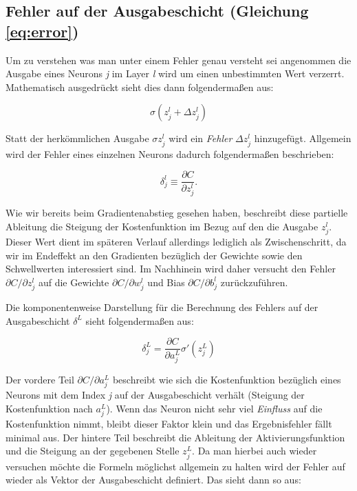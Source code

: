 \subsection{Fehler auf der Ausgabeschicht (Gleichung \ref{eq:error})}
Um zu verstehen was man unter einem Fehler genau versteht sei angenommen die Ausgabe eines Neurons \emph{j} im Layer \emph{l} wird um einen unbestimmten Wert verzerrt. Mathematisch ausgedrückt sieht dies dann folgendermaßen aus: 

\begin{equation}
\sigma(z^l_j+\Delta z^l_j)
\end{equation}

Statt der herkömmlichen Ausgabe $\sigma{z^l_j}$ wird ein \emph{Fehler} $\Delta z^l_j$ hinzugefügt. Allgemein wird der Fehler eines einzelnen Neurons dadurch folgendermaßen beschrieben: 

\begin{equation}
\delta^l_j \equiv \frac{\partial C}{\partial z^l_j}.
\end{equation}

Wie wir bereits beim Gradientenabstieg gesehen haben, beschreibt diese partielle Ableitung die \glqq Steigung \grqq der Kostenfunktion im Bezug auf den die Ausgabe $z^l_j$. Dieser Wert dient im späteren Verlauf allerdings lediglich als Zwischenschritt, da wir im Endeffekt an den Gradienten bezüglich der Gewichte sowie den Schwellwerten interessiert sind. Im Nachhinein wird daher versucht den Fehler ${\partial C / \partial z^l_j}$ auf die Gewichte ${\partial C / \partial w^l_j}$ und Bias ${\partial C / \partial b^l_j}$ zurückzuführen. 

Die komponentenweise Darstellung für die Berechnung des Fehlers auf der Ausgabeschicht $\delta^L$ sieht folgendermaßen aus:

\begin{equation}
\delta^L_j = \frac{\partial C}{\partial a^L_j} \sigma'(z^L_j)
\end{equation}

Der vordere Teil $\partial C / \partial a^L_j$ beschreibt wie sich die Kostenfunktion bezüglich eines Neurons mit dem Index \emph{j} auf der Ausgabeschicht verhält (Steigung der Kostenfunktion nach $a^L_j$). Wenn das Neuron nicht sehr viel \emph{Einfluss} auf die Kostenfunktion nimmt, bleibt dieser Faktor klein und das Ergebnisfehler fällt minimal aus. Der hintere Teil beschreibt die Ableitung der Aktivierungsfunktion und die Steigung an der gegebenen Stelle $z^L_j$. 
Da man hierbei auch wieder versuchen möchte die Formeln möglichst allgemein zu halten wird der Fehler auf wieder als Vektor der Ausgabeschicht definiert. Das sieht dann so aus: 

